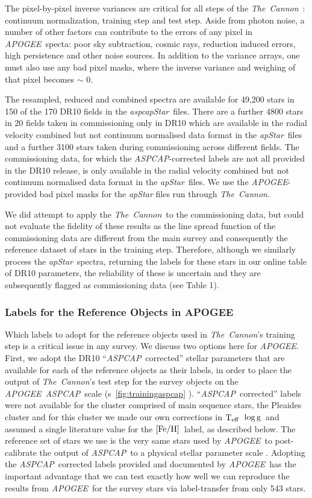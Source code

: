 \documentclass[12pt, preprint]{aastex}
\newcommand{\figurenames}{\figurename s}
\newcommand{\tc}{\textsl{The~Cannon}}
\newcommand{\apogee}{\textsl{APOGEE}}
\newcommand{\aspcap}{\textsl{ASPCAP}}
\newcommand{\aspcapstar}{\textsl{aspcapStar}}
\newcommand{\apstar}{\textsl{apStar}}
\newcommand{\teff}{\mbox{$\rm T_{eff}$}}
\newcommand{\feh}{\mbox{$\rm [Fe/H]$}}
\newcommand{\logg}{\mbox{$\rm \log g$}}
\begin{document}
The pixel-by-pixel inverse variances are critical for all steps of the \tc\ : continuum normalization, training step and test step.
Aside from photon noise, a number of other factors can contribute to the errors of any pixel in \apogee\ specta: poor sky subtraction, cosmic rays, reduction induced errors, high persistence and other noise sources. In addition to the variance arrays, one must also use any bad pixel masks, where the
inverse variance and weighing of that pixel becomes $\sim$ 0. 

The resampled, reduced and combined spectra are available for 49,200 stars in 150 of the 170 DR10 fields in the \aspcapstar\ files. There are a further 4800 stars in 20 fields taken in commissioning only in DR10 which are available in the radial velocity combined but not continuum normalised data format in the \apstar\ files and a further 3100 stars taken during commissioning across different fields. 
The commissioning data, for which the \aspcap-corrected labels are not all provided in the DR10 release, is only available in the radial velocity combined but not continuum normalised data format in the \apstar\ files. 
We use the \apogee -provided bad pixel masks for the \textit{apStar} files run through \tc .

We did attempt to apply the \tc\ to the commissioning data, but could not evaluate the fidelity of these results as the line spread function of the commissioning data are different from the main survey and consequently the reference dataset of stars in the training step. 
Therefore, although we similarly process the \apstar\ spectra, returning the labels for these stars in our online table of DR10 parameters, the reliability of these is uncertain and they are subsequently flagged as commissioning data (see Table 1).


\subsubsection{Labels for the Reference Objects in APOGEE}
\label{sec:ApogeeRefLabels}

Which labels to adopt for the reference objects used in \tc 's training step is a critical issue
in any survey. We discuss two options here for \apogee . 
First, we adopt the DR10 ``\aspcap\ corrected'' stellar parameters that are available for each of the reference objects as their labels, in order to place the output of \tc 's test step for the survey objects on the \apogee\ \aspcap\ scale (\figurenames~\ref{fig:trainingaspcap} ). ``\aspcap\ corrected'' labels were not available for the cluster comprised of main sequence stars, the Pleaides cluster and for this cluster we made our own corrections in \teff\, \logg\ and assumed a single literature value for the \feh\ label, as described below. 
The reference set of stars we use is the very same stars used by \apogee\ to post-calibrate the output of \aspcap\ to a physical stellar parameter scale \citep{Meszaros2013}.
Adopting the \aspcap\ corrected labels provided and documented by \apogee\ has the important advantage 
that we can test exactly how well we can reproduce the results from \apogee\ for the survey stars via label-transfer from only 543 stars.
\end{document}
